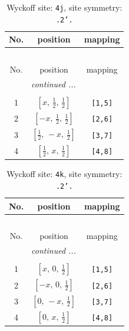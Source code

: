 \documentclass[fleqn,8pt]{jsarticle}
\begin{document}
\begin{longtable}{ccc}
\caption{Wyckoff site: {\tt 4j}, site symmetry: {\tt .2'.}}
 \\
 \hline \hline
No. & position & mapping \\ \hline \endfirsthead

\multicolumn{2}{l}{\tablename\ \thetable{}} \\
 \hline \hline
No. & position & mapping \\ \hline \endhead

 \hline \hline
\multicolumn{2}{r}{\footnotesize\it continued ...} \\ \endfoot

 \hline \hline
\multicolumn{2}{r}{} \\ \endlastfoot

1 & $\left[ x,\, \frac{1}{2},\, \frac{1}{2} \right]$ & {\tt [1,5]} \\ \hline
2 & $\left[ - x,\, \frac{1}{2},\, \frac{1}{2} \right]$ & {\tt [2,6]} \\ \hline
3 & $\left[ \frac{1}{2},\, - x,\, \frac{1}{2} \right]$ & {\tt [3,7]} \\ \hline
4 & $\left[ \frac{1}{2},\, x,\, \frac{1}{2} \right]$ & {\tt [4,8]} \\
\end{longtable}
\renewcommand{\arraystretch}{1.2}
\begin{longtable}{ccc}
\caption{Wyckoff site: {\tt 4k}, site symmetry: {\tt .2'.}}
 \\
 \hline \hline
No. & position & mapping \\ \hline \endfirsthead

\multicolumn{2}{l}{\tablename\ \thetable{}} \\
 \hline \hline
No. & position & mapping \\ \hline \endhead

 \hline \hline
\multicolumn{2}{r}{\footnotesize\it continued ...} \\ \endfoot

 \hline \hline
\multicolumn{2}{r}{} \\ \endlastfoot

1 & $\left[ x,\, 0,\, \frac{1}{2} \right]$ & {\tt [1,5]} \\ \hline
2 & $\left[ - x,\, 0,\, \frac{1}{2} \right]$ & {\tt [2,6]} \\ \hline
3 & $\left[ 0,\, - x,\, \frac{1}{2} \right]$ & {\tt [3,7]} \\ \hline
4 & $\left[ 0,\, x,\, \frac{1}{2} \right]$ & {\tt [4,8]} \\
\end{longtable}
\end{document}
